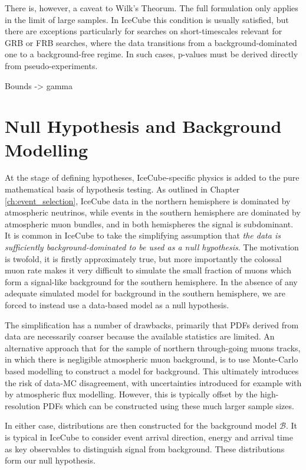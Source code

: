 There is, however, a caveat to Wilk's Theorum. The full formulation only applies in the limit of large samples. In IceCube this condition is usually satisfied, but there are exceptions particularly for searches on short-timescales relevant for GRB or FRB searches, where the data transitions from a background-dominated one to a background-free regime. In such cases, p-values must be derived directly from pseudo-experiments. 

Bounds -> gamma

\section{Null Hypothesis and Background Modelling}

At the stage of defining hypotheses, IceCube-specific physics is added to the pure mathematical basis of hypothesis testing. As outlined in Chapter \ref{ch:event_selection}, IceCube data in the northern hemisphere is dominated by atmospheric neutrinos, while events in the southern hemisphere are dominated by atmospheric muon bundles, and in both hemispheres the signal is subdominant. It is common in IceCube to take the simplifying assumption that \emph{the data is sufficiently background-dominated to be used as a null hypothesis}. The motivation is twofold, it is firstly approximately true, but more importantly the colossal muon rate makes it very difficult to simulate the small fraction of muons which form a signal-like background for the southern hemisphere. In the absence of any adequate simulated model for background in the southern hemisphere, we are forced to instead use a data-based model as a null hypothesis.

The simplification has a number of drawbacks, primarily that PDFs derived from data are necessarily coarser because the available statistics are limited. An alternative approach that for the sample of northern through-going muons tracks, in which there is negligible atmospheric muon background, is to use Monte-Carlo based modelling to construct a model for background. This ultimately introduces the risk of data-MC disagreement,  with uncertainties introduced for example with by atmospheric flux modelling. However, this is typically offset by the high-resolution PDFs which can be constructed using these much larger sample sizes.

In either case, distributions are then constructed for the background model $\mathcal{B}$. It is typical in IceCube to consider event arrival direction, energy and arrival time as key observables to distinguish signal from background. These distributions form our null hypothesis.

